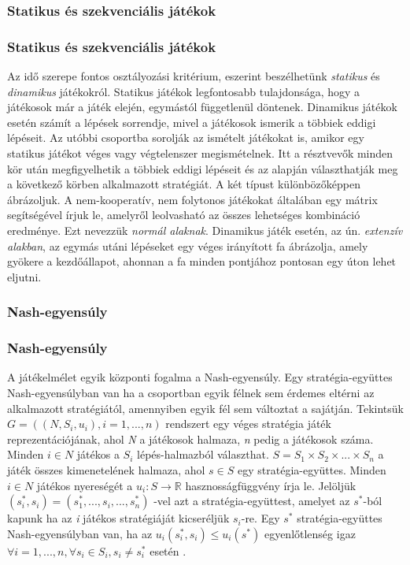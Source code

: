 \subsubsection{Statikus és szekvenciális játékok}
\begin{frame}
\frametitle{Statikus és szekvenciális játékok}
Az idő szerepe fontos osztályozási kritérium, eszerint beszélhetünk \textit{statikus} és \textit{dinamikus} játékokról. Statikus játékok legfontosabb tulajdonsága, hogy a játékosok már a játék elején, egymástól függetlenül döntenek. Dinamikus játékok esetén számít a lépések sorrendje, mivel a játékosok ismerik a többiek eddigi lépéseit. Az utóbbi csoportba sorolják az ismételt játékokat is, amikor egy statikus játékot véges vagy végtelenszer megismételnek. Itt a résztvevők minden kör után megfigyelhetik a többiek eddigi lépéseit és az alapján választhatják meg a következő körben alkalmazott stratégiát. A két típust különbözőképpen ábrázoljuk. A nem-kooperatív, nem folytonos játékokat általában egy mátrix segítségével írjuk le, amelyről leolvasható az összes lehetséges kombináció eredménye. Ezt nevezzük \textit{normál alaknak}. Dinamikus játék esetén, az ún. \textit{extenzív alakban}, az egymás utáni lépéseket egy véges irányított fa ábrázolja, amely gyökere a kezdőállapot, ahonnan a fa minden pontjához pontosan egy úton lehet eljutni.
\end{frame}

\subsubsection{Nash-egyensúly}
\begin{frame}
\frametitle{Nash-egyensúly}
A játékelmélet egyik központi fogalma a Nash-egyensúly. Egy stratégia-együttes Nash-e\-gyen\-súly\-ban van ha a csoportban egyik félnek sem érdemes eltérni az alkalmazott stratégiától, amennyiben egyik fél sem változtat a sajátján. Tekintsük \(G = ((N,S_i,u_i), i = 1,...,n)\) rendszert egy véges stratégia játék reprezentációjának, ahol \textit{N} a játékosok halmaza, \textit{n} pedig a játékosok száma. Minden \(i \in N\) játékos a \(S_i\) lépés-halmazból választhat. \(S = S_1 \times S_2 \times ... \times S_n\)  a játék összes kimenetelének halmaza, ahol \(s \in S\) egy stratégia-együttes. Minden \(i \in N\) játékos nyereségét a \(u_i:S \to \mathbb{R}\) hasznosságfüggvény írja le. Jelöljük \((s_i^*,s_i) = (s^*_1,...,s_i,...,s_n^*)\) -vel azt a stratégia-együttest, amelyet az \(s^*\)-ból kapunk ha az \textit{i} játékos stratégiáját kicseréljük \(s_i\)-re. Egy \(s^*\) stratégia-együttes Nash-e\-gyen\-súly\-ban van, ha az \(u_i(s_i^*,s_i)\leq u_i(s^*) \) egyenlőtlenség igaz \(\forall i = 1,...,n, \forall s_i \in S_i, s_i \ne s_i^*\) esetén \cite{nash1951non}.
\end{frame}

